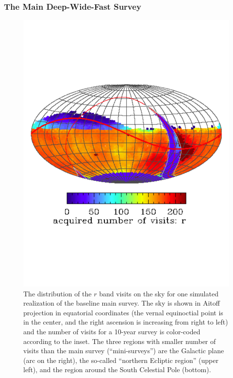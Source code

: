 \documentclass{emulateapj}
\begin{document}
\subsubsection{ The Main Deep-Wide-Fast Survey }


\begin{figure}
\vskip -1.0in
\includegraphics[width=1.0\hsize,clip]{rBandWhite.pdf}
\vskip -1.0in
\caption{The distribution of the $r$ band visits on the sky for one simulated 
realization of the baseline main survey. The sky is shown in Aitoff projection 
in equatorial coordinates (the vernal equinoctial point is in the center, and 
the right ascension is increasing from right to left) and the number of visits for 
a 10-year survey is color-coded according to the inset. The three regions with 
smaller number of visits than the main survey (``mini-surveys'') are the Galactic 
plane (arc on the right), the so-called ``northern Ecliptic region'' (upper left), and
the region around the South Celestial Pole (bottom).} 
\label{Fig:rbandSky}
\end{figure}
\end{document}
